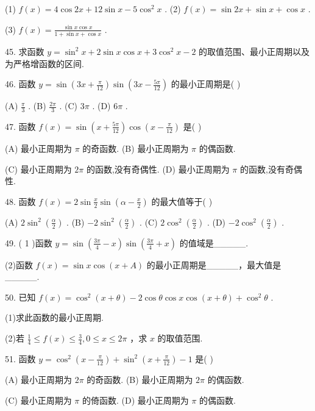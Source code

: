 \documentclass[10pt]{article}
\begin{document}
(1) \(f\left( x\right)  = 4\cos {2x} + {12}\sin x - 5{\cos }^{2}x\) . (2) \(f\left( x\right)  = \sin {2x} + \sin x + \cos x\) .

(3) \(f\left( x\right)  = \frac{\sin x\cos x}{1 + \sin x + \cos x}\) .

45. 求函数 \(y = {\sin }^{2}x + 2\sin x\cos x + 3{\cos }^{2}x - 2\) 的取值范围、最小正周期以及为严格增函数的区间.

46. 函数 \(y = \sin \left( {{3x} + \frac{\pi }{12}}\right) \sin \left( {{3x} - \frac{5\pi }{12}}\right)\) 的最小正周期是( )

(A) \(\frac{\pi }{3}\) . (B) \(\frac{2\pi }{3}\) . (C) \({3\pi }\) . (D) \({6\pi }\) .

47. 函数 \(f\left( x\right)  = \sin \left( {x + \frac{5\pi }{12}}\right) \cos \left( {x - \frac{\pi }{12}}\right)\) 是( )

(A) 最小正周期为 \(\pi\) 的奇函数. (B) 最小正周期为 \(\pi\) 的偶函数.

(C) 最小正周期为 \({2\pi }\) 的函数,没有奇偶性. (D) 最小正周期为 \(\pi\) 的函数,没有奇偶性.

48. 函数 \(f\left( x\right)  = 2\sin \frac{x}{2}\sin \left( {\alpha  - \frac{x}{2}}\right)\) 的最大值等于( )

(A) \(2{\sin }^{2}\left( \frac{\alpha }{2}\right)\) . (B) \(- 2{\sin }^{2}\left( \frac{\alpha }{2}\right)\) . (C) \(2{\cos }^{2}\left( \frac{\alpha }{2}\right)\) . (D) \(- 2{\cos }^{2}\left( \frac{\alpha }{2}\right)\) .

49. ( 1 )函数 \(y = \sin \left( {\frac{3\pi }{4} - x}\right) \sin \left( {\frac{3\pi }{4} + x}\right)\) 的值域是\_\_\_\_\_.

(2)函数 \(f\left( x\right)  = \sin x\cos \left( {x + A}\right)\) 的最小正周期是\_\_\_\_\_，最大值是\_\_\_\_\_.

50. 已知 \(f\left( x\right)  = {\cos }^{2}\left( {x + \theta }\right)  - 2\cos \theta \cos x\cos \left( {x + \theta }\right)  + {\cos }^{2}\theta\) .

(1)求此函数的最小正周期.

(2)若 \(\frac{1}{4} \leq  f\left( x\right)  \leq  \frac{3}{4},0 \leq  x \leq  {2\pi }\) ，求 \(x\) 的取值范围.

51. 函数 \(y = {\cos }^{2}\left( {x - \frac{\pi }{12}}\right)  + {\sin }^{2}\left( {x + \frac{\pi }{12}}\right)  - 1\) 是( )

(A) 最小正周期为 \({2\pi }\) 的奇函数. (B) 最小正周期为 \({2\pi }\) 的偶函数.

(C) 最小正周期为 \(\pi\) 的倚函数. (D) 最小正周期为 \(\pi\) 的偶函数.
\end{document}
